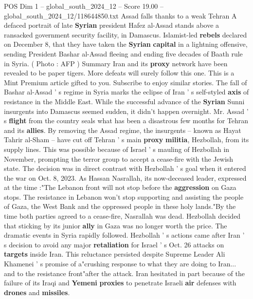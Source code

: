\begin{textsample}{POS Dim 1 – global\_south\_2024\_12 – Score 19.00 – global\_south\_2024\_12/118644850.txt}  \label{ex:f1_pos_200}
Assad falls thanks to a weak Tehran A defaced portrait of late \textbf{Syrian} president Hafez al-Assad stands above a ransacked government security facility, in Damascus.
Islamist-led \textbf{rebels} declared on December 8, that they have taken the \textbf{Syrian} \textbf{capital} in a lightning offensive, sending President Bashar al-Assad fleeing and ending five decades of Baath rule in Syria. ( Photo : AFP ) Summary Iran and its \textbf{proxy} network have been revealed to be paper tigers.
More defeats will surely follow this one.
This is a Mint Premium article gifted to you.
Subscribe to enjoy similar stories.
The fall of Bashar al-Assad ' s regime in Syria marks the eclipse of Iran ' s self-styled \textbf{axis} of resistance in the Middle East.
While the successful advance of the \textbf{Syrian} Sunni insurgents into Damascus seemed sudden, it didn't happen overnight.
Mr.
Assad ' s \textbf{flight} from the country seals what has been a disastrous few months for Tehran and its \textbf{allies}.
By removing the Assad regime, the insurgents -- known as Hayat Tahrir al-Sham -- have cut off Tehran ' s main \textbf{proxy} \textbf{militia}, Hezbollah, from its supply lines.
This was possible because of Israel ' s mauling of Hezbollah in November, prompting the terror group to accept a cease-fire with the Jewish state.
The decision was in direct contrast with Hezbollah ' s goal when it entered the war on Oct. 8, 2023.
As Hassan Nasrallah, its now-deceased leader, expressed at the time :"The Lebanon front will not stop before the \textbf{aggression} on Gaza stops.
The resistance in Lebanon won't stop supporting and assisting the people of Gaza, the West Bank and the oppressed people in these holy lands."By the time both parties agreed to a cease-fire, Nasrallah was dead.
Hezbollah decided that sticking by its junior \textbf{ally} in Gaza was no longer worth the price.
The dramatic events in Syria rapidly followed.
Hezbollah ' s actions came after Iran ' s decision to avoid any major \textbf{retaliation} for Israel ' s Oct. 26 attacks on \textbf{targets} inside Iran.
This reluctance persisted despite Supreme Leader Ali Khamenei ' s promise of a"crushing response to what they are doing to Iran... and to the resistance front"after the attack.
Iran hesitated in part because of the failure of its Iraqi and \textbf{Yemeni} \textbf{proxies} to penetrate Israeli \textbf{air} defenses with \textbf{drones} and \textbf{missiles}.

\end{textsample}
